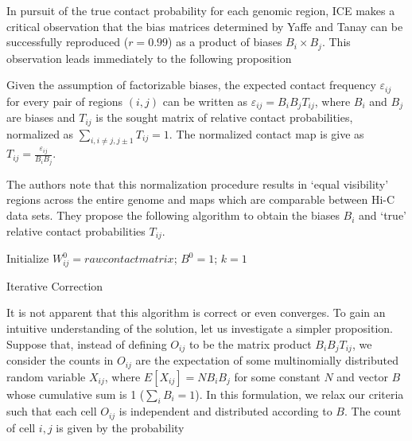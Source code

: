 In pursuit of the true contact probability for each genomic region, \gls{ICE} makes a critical observation that the bias matrices determined by
Yaffe and Tanay\cite{yaffe2011} can be successfully reproduced ($r = 0.99$) as a product of biases $B_i \times B_j$.  This observation leads
immediately to the following proposition

\begin{prop}
  Given the assumption of factorizable biases, the expected contact frequency $\varepsilon_{ij}$ for every pair of regions $(i,j)$ can
  be written as $\varepsilon_{ij} = B_{i}B_{j}T_{ij}$, where $B_i$ and $B_j$ are biases and $T_{ij}$ is the sought matrix of relative contact
  probabilities, normalized as $\sum_{i, i \neq j, j \pm 1}T_{ij} = 1$.  The normalized contact map is give as
  $T_{ij} = \frac{\varepsilon_{ij}}{B_{i}B_{j}}$.
\end{prop}

The authors note that this normalization procedure results in `equal visibility' regions across the entire genome and maps which are
comparable between Hi-C data sets.  They propose the following algorithm to obtain the biases $B_i$ and `true' relative contact probabilities
$T_{ij}$.

\begin{algorithm}[H]
  Initialize $W^{0}_{ij} = raw contact matrix$; $B^0 = 1$; $k = 1$\;
  \caption{Iterative Correction}
\end{algorithm}

It is not apparent that this algorithm is correct or even converges.  To gain an intuitive understanding of the solution, let us investigate a
simpler proposition.  Suppose that, instead of defining $O_{ij}$ to be the matrix product $B_{i}B_{j}T_{ij}$, we consider the counts
in $O_{ij}$ are the expectation of some multinomially distributed random variable $X_{ij}$, where $E[X_{ij}] = NB_{i}B_j$ for some
constant $N$ and vector $B$ whose cumulative sum is 1 ($\sum_{i}B_i = 1$).  In this formulation, we relax our criteria such that each cell
$O_{ij}$ is independent and distributed according to $B$.  The count of cell $i,j$ is given by the probability


